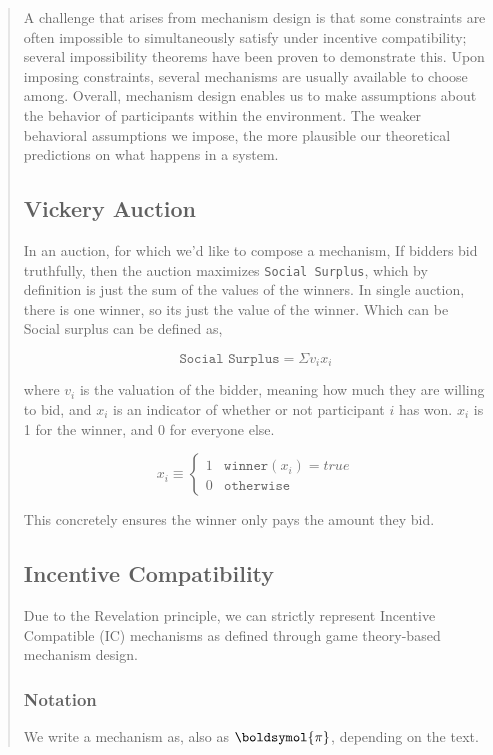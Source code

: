 \documentclass[12pt, titlepage, twocolumn]{report}
\begin{document}
\begin{quotation}
A challenge that arises from mechanism design is that some constraints are often impossible to simultaneously satisfy under incentive compatibility; several impossibility theorems have been proven to demonstrate this. Upon imposing constraints, several mechanisms are usually available to choose among. Overall, mechanism design enables us to make assumptions about the behavior of participants within the environment. The weaker behavioral assumptions we impose, the more plausible our theoretical predictions on what happens in a system.


\subsection{Vickery Auction}

In an auction, for which we'd like to compose a mechanism, If bidders bid truthfully, then the auction maximizes \texttt{Social Surplus}, which by definition is just the sum of the values of the winners. In single auction, there is one winner, so its just the value of the winner. Which can be Social surplus can be defined as,

\begin{equation}
\texttt{Social Surplus} = \Sigma v_i x_i
\end{equation}

where \(v_i\) is the valuation of the bidder, meaning how much they are willing to bid, and \(x_i\) is an indicator of whether or not participant \(i\) has won. \(x_i\) is 1 for the winner, and 0 for everyone else.

\begin{equation}
	x_i \equiv
	\begin{cases}
	 1 & \texttt{winner}(x_i) = true \\
	 0 & \texttt{otherwise}
	\end{cases}
\end{equation}

This concretely ensures the winner only pays the amount they bid.


\subsection{Incentive Compatibility}
Due to the Revelation principle, we can strictly represent Incentive Compatible (IC) mechanisms as defined through game theory-based mechanism design. 

\subsubsection{Notation}
We write a mechanism as, also as \(\boldsymol{\pi}\), depending on the text.


\end{quotation}
\end{document}
